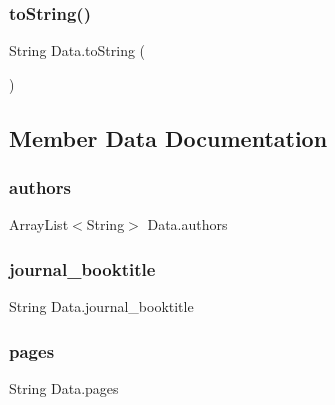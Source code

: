 \hypertarget{class_data_a7c190e5a2f3f11629a13a90d05e9e1cf}{}\label{class_data_a7c190e5a2f3f11629a13a90d05e9e1cf} 
\subsubsection{\texorpdfstring{to\+String()}{toString()}}
{\footnotesize\ttfamily String Data.\+to\+String (\begin{DoxyParamCaption}{ }\end{DoxyParamCaption})}



\subsection{Member Data Documentation}
\hypertarget{class_data_ae6e0036466319e383caab1ad88fdb5b6}{}\label{class_data_ae6e0036466319e383caab1ad88fdb5b6} 
\subsubsection{\texorpdfstring{authors}{authors}}
{\footnotesize\ttfamily Array\+List$<$String$>$ Data.\+authors\hspace{0.3cm}{\ttfamily [private]}}

\hypertarget{class_data_affdd242bc2e170a80620fb91c075ced9}{}\label{class_data_affdd242bc2e170a80620fb91c075ced9} 
\subsubsection{\texorpdfstring{journal\+\_\+booktitle}{journal\_booktitle}}
{\footnotesize\ttfamily String Data.\+journal\+\_\+booktitle\hspace{0.3cm}{\ttfamily [private]}}

\hypertarget{class_data_a7fa32ce168de5abce2bb00f3e1f4e23b}{}\label{class_data_a7fa32ce168de5abce2bb00f3e1f4e23b} 
\subsubsection{\texorpdfstring{pages}{pages}}
{\footnotesize\ttfamily String Data.\+pages\hspace{0.3cm}{\ttfamily [private]}}

